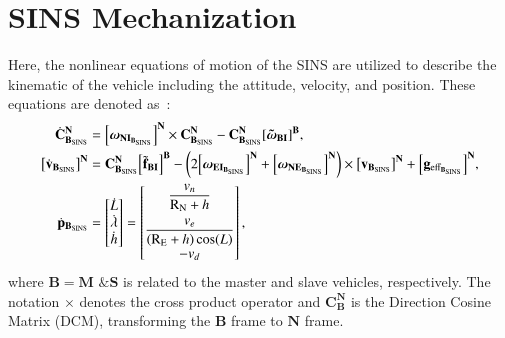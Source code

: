 \documentclass[3p]{elsarticle}
\begin{document}
\section{SINS Mechanization}\label{sec:SINS}
\noindent Here, the nonlinear equations of motion of the SINS are utilized to describe the kinematic of the vehicle including the attitude, velocity, and position. These equations are denoted as~\cite{bekir2007introduction}:
\begin{align}
\centering
		\label{eq:INS1}
		\dot{\mathbf{C}}_{\mathbf{B}_{\text{SINS}}}^{\mathbf{N}} &=
		{\left[\boldsymbol{{\omega}}_{\mathbf{NI}_{\mathbf{B}_{\text{SINS}}}}\right]}^{\mathbf{N}}  \times \mathbf{C}_{\mathbf{B}_{\text{SINS}}}^{\mathbf{N}}
		- \mathbf{C}_{\mathbf{B}_{\text{SINS}}}^{\mathbf{N}} {\left[\boldsymbol{\tilde{\omega}}_{\mathbf{BI}}\right]}^{\mathbf{B}}, \\
		\label{eq:INS2}
		{{\left[{{\dot{\mathbf{v}}}}_{{\mathbf{B}_{\text{SINS}}}}\right]}^{\mathbf{N}}} &= {\mathbf{C}}_{\mathbf{B}_{\text{SINS}}}^{\mathbf{N}}{\left[\tilde{\mathbf{{f}}}_{\mathbf{BI}}\right]}^{\mathbf{B}} - \left( 2{{\left[\boldsymbol{\omega}_{{\mathbf{EI}}_{\mathbf{B}_{\text{SINS}}}}\right]}^{\mathbf{N}} + {\left[\boldsymbol{\omega}_{{\mathbf{NE}}_{\mathbf{B}_{\text{SINS}}}}\right]}^{\mathbf{N}}} \right)\times{{{\left[\mathbf{v}_{\mathbf{B}_{\text{SINS}}}\right]}}^{\mathbf{N}}} + {{\left[{\mathbf{g}}_{{\text{eff}}_{\mathbf{B}_{\text{SINS}}}}\right]}^{\mathbf{N}}},\\
		\label{eq:INS3}
		\dot{\mathbf{p}}_{\mathbf{B}_{\text{SINS}}} &= \begin{bmatrix}
			\dot{L} \\
			\dot{\lambda} \\
			\dot{h}
		\end{bmatrix} = \begin{bmatrix}
			\dfrac{v_n}{\mathrm{R_N}+h}\\[1em]
			\dfrac{v_e}{(\mathrm{R_E} + h)\cos(L)}\\
			-v_d
		\end{bmatrix},
	\end{align}
where \(\mathbf{B} = \mathbf{M} \text{ \& } \mathbf{S}\)
is related to the master and slave vehicles, respectively. The
 notation \(\times\) denotes the cross product operator and \(\mathbf{C}_{\mathbf{B}}^{\mathbf{N}}\) is the Direction Cosine Matrix (DCM), transforming the \({\mathbf{B}}\) frame to \({\mathbf{N}}\) frame.
\end{document}
